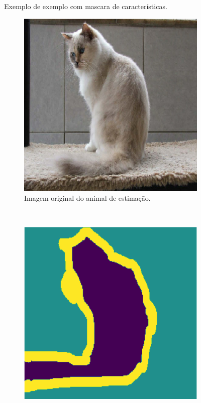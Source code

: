 \begin{figure}[H]
   \centering
   \caption{Exemplo de exemplo com mascara de características.}
   \caption{Segmentação semântica.}
   \label{project:fig:dataset:pets_1}
    \begin{subfigure}[t]{0.5\textwidth}
        \centering
        \includegraphics[width=1\linewidth]{recursos/imagens/project/pets_ori.png}
        \caption{Imagem original do animal de estimação.}
        \label{project:fig:dataset:pets_1.1}
    \end{subfigure}%
    ~ 
    \begin{subfigure}[t]{0.5\textwidth}
        \centering
        \includegraphics[width=1\linewidth]{recursos/imagens/project/pets_mask.png}

\end{subfigure}
\end{figure}
